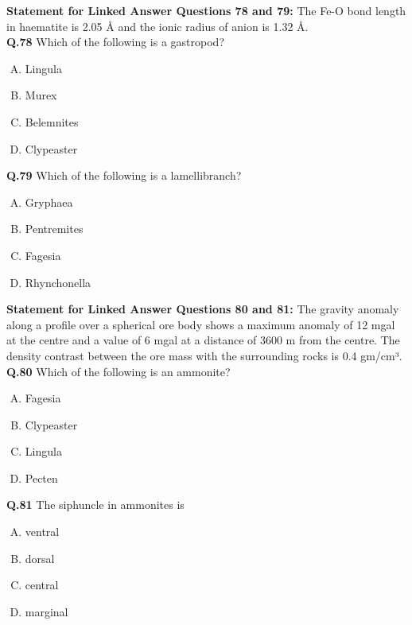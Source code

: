 \noindent\textbf{Statement for Linked Answer Questions 78 and 79:} The Fe-O bond length in haematite is 2.05 Å and the ionic radius of anion is 1.32 Å.\\

\textbf{Q.78} Which of the following is a gastropod?
\begin{enumerate}[(A)]
    \item Lingula
    \item Murex
    \item Belemnites
    \item Clypeaster
\end{enumerate}

\textbf{Q.79} Which of the following is a lamellibranch?
\begin{enumerate}[(A)]
    \item Gryphaea
    \item Pentremites
    \item Fagesia
    \item Rhynchonella
\end{enumerate}
\noindent\textbf{Statement for Linked Answer Questions 80 and 81:} The gravity anomaly along a profile over a spherical
ore body shows a maximum anomaly of 12 mgal at the centre and a value of 6 mgal at a distance of 3600 m
from the centre. The density contrast between the ore mass with the surrounding rocks is 0.4 gm/cm³.\\

\textbf{Q.80} Which of the following is an ammonite?
\begin{multicols}{4}
    

\begin{enumerate}[(A)]
    \item Fagesia
    \item Clypeaster
    \item Lingula
    \item Pecten
\end{enumerate}
\end{multicols} 
\textbf{Q.81} The siphuncle in ammonites is
\begin{multicols}{4}
    

\begin{enumerate}[(A)]
    \item ventral
    \item dorsal
    \item central
    \item marginal
\end{enumerate}
\end{multicols}

